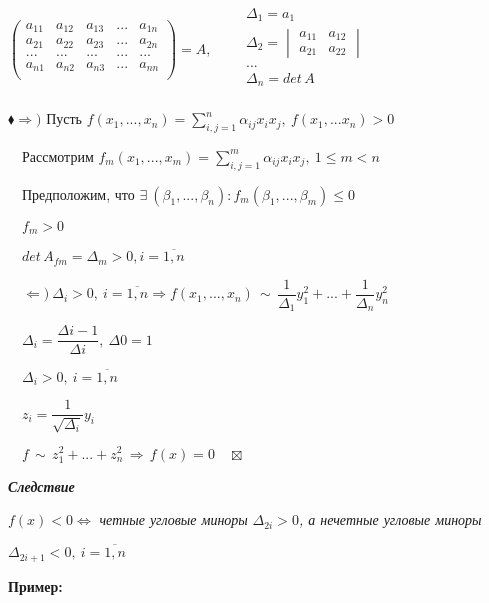 \documentclass[a4paper, 12pt]{report}
\begin{document}
	$\begin{pmatrix}
		a_{11}& a_{12}&a_{13}&...&a_{1n}\\
		a_{21}& a_{22}&a_{23}&...&a_{2n}\\
		...&...&...&...&...\\
		a_{n1}& a_{n2}&a_{n3}&...&a_{nn}\\
	\end{pmatrix}= A,\quad \quad 
	\begin{matrix}
		\Delta_1=a_1 \\
		\Delta_2=\begin{vmatrix} a_{11} & a_{12} \\ a_{21} & a_{22} \end{vmatrix} \\
		...\\
		\Delta_n =det \, A\\
	\end{matrix}
	$
	\par \bigskip
	$\blacklozenge \Rightarrow )$ Пусть $f(x_1,...,x_n) = 
	\sum_{i,j=1}^n \alpha_{ij} x_i x_j,\ f(x_1,...x_n)>0$\par
	$\quad$Рассмотрим $f_m(x_1,...,x_m) = 
	\sum_{i,j=1}^m\alpha_{ij} x_i x_j,\ 1 \leqslant m < n$\par
	$\quad$Предположим, что $\exists\ (\beta_1,...,\beta_n): f_m(\beta_1,...,\beta_m) \leqslant 0$\par
	$\quad f_m > 0$\par
	$\quad det \, A_{fm}=\Delta_m>0, i=\overline{1,n}$
	\par \bigskip
	$\quad \Leftarrow )\ \Delta_i > 0,\ i=\overline{1,n} \Rightarrow f(x_1,...,x_n) \, \sim \, \dfrac1{\Delta_1} y_1^2 +...+\dfrac1{\Delta_n} y_n^2$\par
	$\quad \Delta_i=\dfrac{\Delta i -1}{\Delta i}, \ \Delta 0=1$\par
	$\quad \Delta_i >0, \ i=\overline{1,n}$\par
	$\quad z_i=\dfrac1{\sqrt{\Delta_i}} y_i$\par
	$\quad f \, \sim \, z_1^2+...+z_n^2 \, \Rightarrow \, f(x)=0\quad\boxtimes$
	\par \bigskip
	\textit{\textbf{Следствие}}
	
	$f(x)<0 \Longleftrightarrow $\textit{ четные угловые миноры }$\Delta_{2i} >0$\textit{, а нечетные угловые миноры  }
	\par $\Delta_{2i+1} <0,\ i=\overline{1,n}$
	\par \bigskip
	\textbf{Пример:}
	
\end{document}
